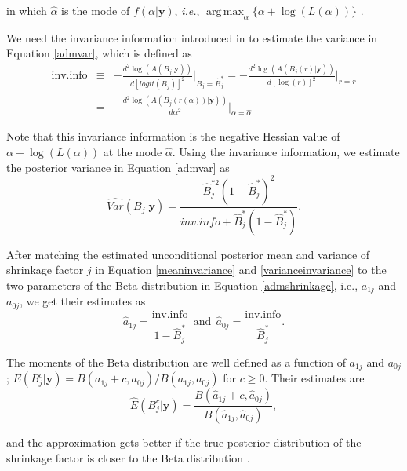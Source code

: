 \documentclass[article]{jss}
\DeclareMathOperator*{\argmax}{arg\,max}
\begin{document}
in which $\hat{\alpha}$ is the mode of $f(\alpha\vert\boldsymbol{y})$, \emph{i.e.}, $\argmax_{\alpha}\{\alpha+\log(L(\alpha))\}$ .

We need the invariance information introduced in \cite{tang2011} to estimate the variance in Equation \ref{admvar}, which is defined as 
\begin{eqnarray}
\textrm{inv.info} &\equiv& -\frac{d^2 \log(A(B_j\vert \boldsymbol{y}))}{d[logit(B_j)]^2}\bigg\vert_{B_j=\hat{B}^\ast_j}=-\frac{d^2 \log(A(B_j(r)\vert \boldsymbol{y}))}{d[\log(r)]^2}\bigg\vert_{r=\hat{r}}\label{invariance}\\
&=& -\frac{d^2 \log(A(B_j(r(\alpha))\vert \boldsymbol{y}))}{d\alpha^2}\bigg\vert_{\alpha=\hat{\alpha}}\nonumber
\end{eqnarray}

Note that this invariance information is  the negative Hessian value of $\alpha+\log(L(\alpha))$ at the mode $\hat{\alpha}$. Using the invariance information, we  estimate the posterior variance in Equation \ref{admvar} as
\begin{equation}\label{varianceinvariance}
\widehat{Var}(B_j\vert\boldsymbol{y})=\frac{\hat{B}^{\ast2}_j(1-\hat{B}^\ast_j)^2}{inv.info +\hat{B}^\ast_j(1-\hat{B}^\ast_j)}.
\end{equation}

After matching the estimated unconditional posterior mean and variance of shrinkage factor $j$ in Equation \ref{meaninvariance} and \ref{varianceinvariance} to the two parameters of the Beta distribution in Equation \ref{admshrinkage}, i.e., $a_{1j}$ and $a_{0j}$, we get their estimates as
\begin{equation}\label{admpara}
\hat{a}_{1j}=\frac{\textrm{inv.info}}{1-\hat{B}^\ast_j}~~\textrm{and}~~\hat{a}_{0j}=\frac{\textrm{inv.info}}{\hat{B}^\ast_j}.
\end{equation}

The moments of the Beta distribution are well defined as a function of $a_{1j}$ and $a_{0j}$; $E(B^c_j\vert\boldsymbol{y})=B(a_{1j} + c, a_{0j})/B(a_{1j}, a_{0j})$ for $c\ge0$. Their estimates are 
\begin{equation}\label{shrinkagemoments}
\widehat{E}(B^c_j\vert\boldsymbol{y})= \frac{B(\hat{a}_{1j} + c, \hat{a}_{0j})}{B(\hat{a}_{1j}, \hat{a}_{0j})},
\end{equation}

and the approximation gets better if the true posterior distribution of the shrinkage factor is closer to the Beta distribution \citep{morris1997, tang2011, morris2012}.
\end{document}
